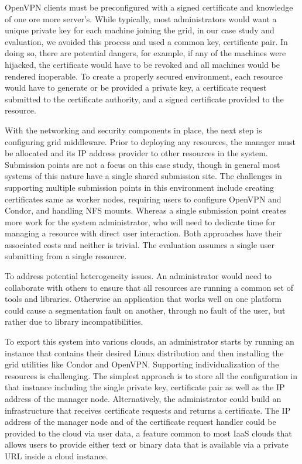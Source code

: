 \documentclass[twocolumn]{svjour3}
\begin{document}
OpenVPN clients must be preconfigured with a signed certificate and knowledge
of one ore more server's.  While typically, most administrators would want a
unique private key for each machine joining the grid, in our case study and
evaluation, we avoided this process and used a common key, certificate pair.
In doing so, there are potential dangers, for example, if any of the machines
were hijacked, the certificate would have to be revoked and all machines would
be rendered inoperable.  To create a properly secured environment, each
resource would have to generate or be provided a private key, a certificate
request submitted to the certificate authority, and a signed certificate
provided to the resource.

With the networking and security components in place, the next step is
configuring grid middleware.  Prior to deploying any resources, the manager
must be allocated and its IP address provider to other resources in the system.
Submission points are not a focus on this case study, though in general most
systems of this nature have a single shared submission site.  The challenges in
supporting multiple submission points in this environment include creating
certificates same as worker nodes,  requiring users to configure OpenVPN and
Condor, and handling NFS mounts.  Whereas a single submission point creates
more work for the system administrator, who will need to dedicate time for
managing a resource with direct user interaction.  Both approaches have their
associated costs and neither is trivial.  The evaluation assumes a single user
submitting from a single resource.

To address potential heterogeneity issues.  An administrator would need to
collaborate with others to ensure that all resources are running a common set
of tools and libraries.  Otherwise an application that works well on one
platform could cause a segmentation fault on another, through no fault of the
user, but rather due to library incompatibilities. 

To export this system into various clouds, an administrator starts by running
an instance that contains their desired Linux distribution and then installing
the grid utilities like Condor and OpenVPN.  Supporting individualization of
the resources is challenging.  The simplest approach is to store all the
configuration in that instance including the single private key, certificate
pair as well as the IP address of the manager node.  Alternatively, the
administrator could build an infrastructure that receives certificate requests
and returns a certificate.  The IP address of the manager node and of the
certificate request handler could be provided to the cloud via user data, a
feature common to most IaaS clouds that allows users to provide either text or
binary data that is available via a private URL inside a cloud instance.
\end{document}
